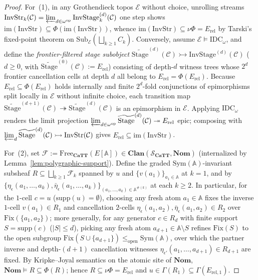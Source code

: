 \documentclass[10pt,twoside,openright]{book}
\theoremstyle{crmplain}
\theoremstyle{crmdef}
\theoremstyle{crmremark}
\begin{document}
\begin{proof}
For~(1), in any Grothendieck topos $\mathcal{E}$ without choice, unrolling streams $\mathrm{InvStr}_k(\mathcal{C}) = \varprojlim_{d \in \omega^{\mathrm{op}}} \mathrm{InvStage}^{(d)}_k(\mathcal{C})$ one step shows $\mathrm{im}(\mathrm{InvStr}) \subseteq \Phi(\mathrm{im}(\mathrm{InvStr}))$, whence $\mathrm{im}(\mathrm{InvStr}) \subseteq \nu\Phi = E_{\mathrm{rel}}$ by Tarski's fixed-point theorem on $\mathrm{Sub}_{\mathcal{E}}(\bigsqcup_{k \ge 1} C_k)$. Conversely, assume $\mathcal{E} \models \mathrm{IDC}_\omega$, and define the \emph{frontier-filtered stage subobject} $\widetilde{\mathrm{Stage}}^{(d)}(\mathcal{C}) \rightarrowtail \mathrm{InvStage}^{(d)}(\mathcal{C})$ ($d \ge 0$, with $\widetilde{\mathrm{Stage}}^{(0)}(\mathcal{C}) := E_{\mathrm{rel}}$) consisting of depth-$d$ witness trees whose $2^d$ frontier cancellation cells at depth $d$ all belong to $E_{\mathrm{rel}} = \Phi(E_{\mathrm{rel}})$. Because $E_{\mathrm{rel}} \subseteq \Phi(E_{\mathrm{rel}})$ holds internally and finite $2^d$-fold conjunctions of epimorphisms split locally in $\mathcal{E}$ without infinite choice, each transition map $\widetilde{\mathrm{Stage}}^{(d+1)}(\mathcal{C}) \twoheadrightarrow \widetilde{\mathrm{Stage}}^{(d)}(\mathcal{C})$ is an epimorphism in $\mathcal{E}$. Applying $\mathrm{IDC}_\omega$ renders the limit projection $\varprojlim_{d \in \omega^{\mathrm{op}}} \widetilde{\mathrm{Stage}}^{(d)}(\mathcal{C}) \twoheadrightarrow E_{\mathrm{rel}}$ epic; composing with $\varprojlim_d \widetilde{\mathrm{Stage}}^{(d)}(\mathcal{C}) \rightarrowtail \mathrm{InvStr}(\mathcal{C})$ gives $E_{\mathrm{rel}} \subseteq \mathrm{im}(\mathrm{InvStr})$.

For~(2), set $\mathcal{F} := \mathrm{Free}_{\mathbf{CaTT}}(E[\mathbb{A}]) \in \mathbf{Clan}(\mathcal{S}_{\mathbf{CaTT}}, \mathbf{Nom})$ (internalized by Lemma~\ref{lem:polygraphic-support}). Define the graded $\mathrm{Sym}(\mathbb{A})$-invariant subsheaf $R \subseteq \bigsqcup_{k \ge 1} \mathcal{F}_k$ spanned by $u$ and $\{v(a_1)\}_{a_1 \in \mathbb{A}}$ at $k = 1$, and by $\{\eta_\epsilon(a_1, \dots, a_k), \bar{\eta}_\epsilon(a_1, \dots, a_k)\}_{(a_1, \dots, a_k) \in \mathbb{A}^{\#(k)}}$ at each $k \ge 2$. In particular, for the $1$-cell $c = u$ ($\mathrm{supp}(u) = \emptyset$), choosing any fresh atom $a_1 \in \mathbb{A}$ fixes the inverse $1$-cell $v(a_1) \in R_1$ and cancellation $2$-cells $\eta_\epsilon(a_1, a_2), \bar{\eta}_\epsilon(a_1, a_2) \in R_2$ over $\mathrm{Fix}(\{a_1, a_2\})$; more generally, for any generator $c \in R_d$ with finite support $S = \mathrm{supp}(c)$ ($|S| \le d$), picking any fresh atom $a_{d+1} \in \mathbb{A} \setminus S$ refines $\mathrm{Fix}(S)$ to the open subgroup $\mathrm{Fix}(S \cup \{a_{d+1}\}) \le_{\mathrm{open}} \mathrm{Sym}(\mathbb{A})$, over which the partner inverse and depth-$(d+1)$ cancellation witnesses $\eta_{\epsilon'}(a_1, \dots, a_{d+1}) \in R_{d+1}$ are fixed. By Kripke--Joyal semantics on the atomic site of $\mathbf{Nom}$, $\mathbf{Nom} \models R \subseteq \Phi(R)$; hence $R \subseteq \nu\Phi = E_{\mathrm{rel}}$ and $u \in \Gamma(R_1) \subseteq \Gamma(E_{\mathrm{rel}, 1})$.


\end{proof}
\end{document}
